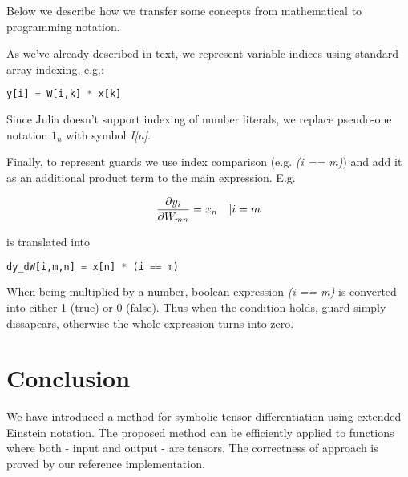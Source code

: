 \documentclass[conference]{IEEEtran}
\begin{document}
Below we describe how we transfer some concepts from mathematical to
programming notation.

As we've already described in text, we represent variable indices
using standard array indexing, e.g.:

\begin{lstlisting}[language=Python]
  y[i] = W[i,k] * x[k]
\end{lstlisting}

Since Julia doesn't support indexing of number literals, we replace
pseudo-one notation $1_n$ with symbol \textit{I[n]}.

Finally, to represent guards we use index comparison (e.g. \textit{(i
  == m)}) and add it as an additional product term to the main
expression. E.g.

$$\pdv{y_i}{W_{mn}} = x_n \quad | i = m$$

is translated into

\begin{lstlisting}[language=Python]
  dy_dW[i,m,n] = x[n] * (i == m)
\end{lstlisting}

When being multiplied by a number, boolean expression \textit{(i ==
  m)} is converted into either 1 (true) or 0 (false). Thus when the
condition holds, guard simply dissapears, otherwise the whole
expression turns into zero.

\newpage

\section{Conclusion}

We have introduced a method for symbolic tensor differentiation using
extended Einstein notation. The proposed method can be efficiently
applied to functions where both - input and output - are tensors. The
correctness of approach is proved by our reference implementation.



 



\end{document}

